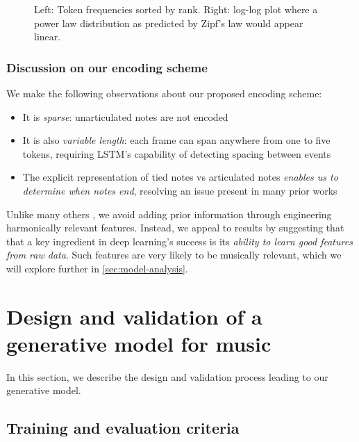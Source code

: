 \begin{figure}[tb]
  \centering
  
  \caption{Left: Token frequencies sorted by rank. Right: log-log plot where
  a power law distribution as predicted by Zipf's law would appear linear.}
  \label{fig:zipf}
\end{figure}

\subsubsection{Discussion on our encoding scheme}

We make the following observations about our proposed encoding scheme:
\begin{itemize}
  \item It is \emph{sparse}: unarticulated notes are not encoded
  \item It is also \emph{variable length}: each frame can span anywhere from one to five tokens, requiring
    LSTM's capability of detecting spacing between events\citep{gers2002learning}
  \item The explicit representation of tied notes vs articulated notes \emph{enables us to
    determine when notes end}, resolving an issue present in many prior works
    \citep{Eck2002,eck2008learning,Liu2014,Brien2016}
\end{itemize}

Unlike many others
\citep{mozer1994neural,franklin2004recurrent,laden1989representation}, we avoid
adding prior information through engineering harmonically relevant features.
Instead, we appeal to results by \citet{bengio2009learning,Bengio2011}
suggesting that that a key ingredient in deep learning's success is its \emph{ability
to learn good features from raw data}. Such features are very likely to be
musically relevant, which we will explore further in \cref{sec:model-analysis}.

\section{Design and validation of a generative model for music}

In this section, we describe the design and validation process leading to our
generative model.

\subsection{Training and evaluation criteria}

